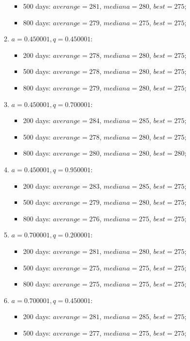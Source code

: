 \begin{enumerate}
\begin{enumerate}
\begin{itemize}
			\item 500 days: $averange = 281$, $mediana = 280$, $best = 275$;
			\item 800 days: $averange = 279$, $mediana = 275$, $best = 275$;
		\end{itemize}
		\item $a= 0.450001, q= 0.450001$:
		\begin{itemize}
			\item 200 days: $averange = 278$, $mediana = 280$, $best = 275$;
			\item 500 days: $averange = 278$, $mediana = 280$, $best = 275$;
			\item 800 days: $averange = 279$, $mediana = 280$, $best = 275$;
		\end{itemize}
		\item $a= 0.450001, q= 0.700001$:
		\begin{itemize}
			\item 200 days: $averange = 284$, $mediana = 285$, $best = 275$;
			\item 500 days: $averange = 278$, $mediana = 280$, $best = 275$;
			\item 800 days: $averange = 280$, $mediana = 280$, $best = 280$;
		\end{itemize}
		\item $a= 0.450001, q= 0.950001$:
		\begin{itemize}
			\item 200 days: $averange = 283$, $mediana = 285$, $best = 275$;
			\item 500 days: $averange = 279$, $mediana = 280$, $best = 275$;
			\item 800 days: $averange = 276$, $mediana = 275$, $best = 275$;
		\end{itemize}
		\item $a= 0.700001, q= 0.200001$:
		\begin{itemize}
			\item 200 days: $averange = 281$, $mediana = 280$, $best = 275$;
			\item 500 days: $averange = 275$, $mediana = 275$, $best = 275$;
			\item 800 days: $averange = 275$, $mediana = 275$, $best = 275$;
		\end{itemize}
		\item $a= 0.700001, q= 0.450001$:
		\begin{itemize}
			\item 200 days: $averange = 281$, $mediana = 285$, $best = 275$;
			\item 500 days: $averange = 277$, $mediana = 275$, $best = 275$;

\end{itemize}
\end{enumerate}
\end{enumerate}
